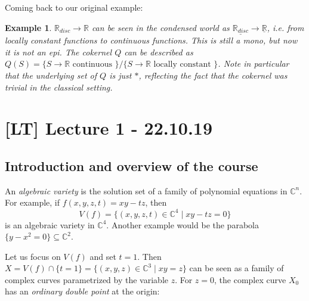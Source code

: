 \documentclass[12pt]{article}
\theoremstyle{darkgreentheorem}
\theoremstyle{darkbluedefinition}
\theoremstyle{darkredexample}
\newtheorem{exa}[thm]{Example}
\theoremstyle{remark}
\newcommand{\1}{\mathbbm{1}}
\newcommand{\C}{\mathbb{C}}
\renewcommand{\u}[1]{\underline{#1}}
\begin{document}
Coming back to our original example:

\begin{exa}
    $\mathbb{R}_{disc}\to \mathbb{R}$ can be seen in the condensed world as $\u{\mathbb{R}_{disc}}\to \u{\mathbb{R}}$, i.e. from locally constant functions to continuous functions.
    This is still a mono, but now it is not an epi.
    The cokernel $Q$ can be described as $Q(S)=\{ S\to \mathbb{R}\text{ continuous }\}/\{ S\to \mathbb{R}\text{ locally constant }\}$.
    Note in particular that the underlying set of $Q$ is just $*$, reflecting the fact that the cokernel was trivial in the classical setting.
\end{exa}

\section{[LT] Lecture 1 - 22.10.19}

\subsection{Introduction and overview of the course}

An \textit{algebraic variety} is the solution set of a family of polynomial equations in $\C^{n}$.
For example, if $f(x,y,z,t)=xy-tz$, then
\[ V(f)=\{(x,y,z,t)\in \C^{4}\mid xy-tz=0\} \]
is an algebraic variety in $\C^{4}$.
Another example would be the parabola $\{ y-x^{2}=0\}\subseteq \C^{2}$.

Let us focus on $V(f)$ and set $t=1$.
Then $X=V(f)\cap \{ t=1 \}=\{(x,y,z)\in \C^{3}\mid xy=z\}$ can be seen as a family of complex curves parametrized by the variable $z$.
For $z=0$, the complex curve $X_{0}$ has an \textit{ordinary double point} at the origin:
\end{document}
